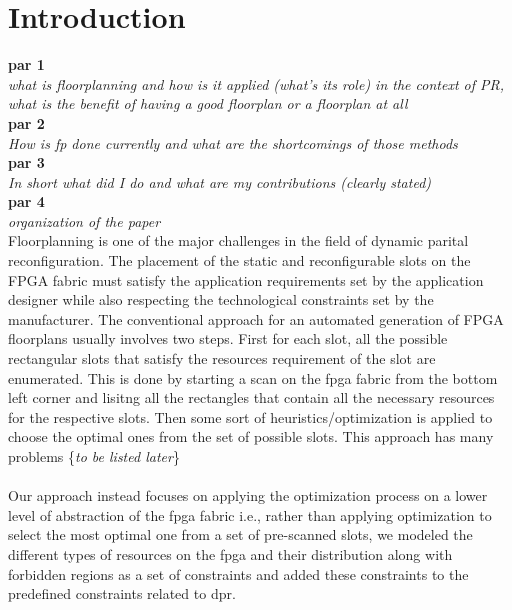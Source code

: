 \section{Introduction}
\textbf{par 1} \\
\textit{what is floorplanning and how is it applied (what's its role) in the context of PR, what is the benefit of having a good floorplan or a floorplan at all} \\

\textbf{par 2} \\
\textit{How is fp done currently and what are the shortcomings of those methods} \\

\textbf{par 3} \\
\textit{In short what did I do and what are my contributions (clearly stated)} \\

\textbf{par 4} \\
\textit{organization of the paper} \\

Floorplanning is one of the major challenges in the field of dynamic parital reconfiguration. The placement of the static and reconfigurable slots on the FPGA fabric must satisfy the application requirements set by the application designer while also respecting the technological constraints set by the manufacturer. The conventional approach for an automated generation of FPGA floorplans usually involves two steps. First for each slot, all the possible rectangular slots that satisfy the resources requirement of the slot are enumerated. This is done by starting a scan on the fpga fabric from the bottom left corner and lisitng all the rectangles that contain all the necessary resources for the respective slots. Then some sort of heuristics/optimization is applied to choose the optimal ones from the set of possible slots. This approach has many problems \{\textit{to be listed later}\}\\\\

Our approach instead focuses on applying the optimization process on a lower level of abstraction of the fpga fabric i.e., rather than applying optimization to select the most optimal one from a set of pre-scanned slots, we modeled the different types of resources on the fpga and their distribution along with forbidden regions as a set of constraints and added these constraints to the predefined constraints related to dpr. \\


